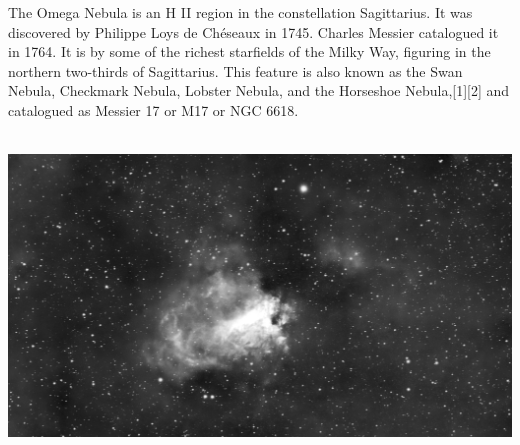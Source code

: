 {\footnotesize\color{white}
The Omega Nebula is an H II region in the constellation Sagittarius. It was discovered by Philippe Loys de Chéseaux in 1745. Charles Messier catalogued it in 1764. It is by some of the richest starfields of the Milky Way, figuring in the northern two-thirds of Sagittarius. This feature is also known as the Swan Nebula, Checkmark Nebula, Lobster Nebula, and the Horseshoe Nebula,[1][2] and catalogued as Messier 17 or M17 or NGC 6618.


}\ \\
\includegraphics[width=\textwidth]{../Imaging//Grayscale/Swann_Nebula.jpg}
